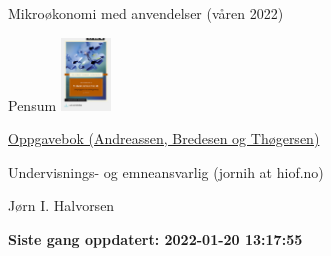 \documentclass[
  ignorenonframetext,
]{beamer}
\begin{document}
\begin{frame}{Mikroøkonomi med anvendelser (våren 2022)}
\begin{block}{Pensum}
\includegraphics[width=0.1\textwidth,height=\textheight]{man/figures/oppgaver.jpg}

\href{https://www.cappelendammundervisning.no/_innforing-i-mikrookonomi-ovingsoppgaver-med-losningsforslag-9788202656485}{Oppgavebok
(Andreassen, Bredesen og Thøgersen)}

Undervisnings- og emneansvarlig (jornih at hiof.no)

Jørn I. Halvorsen

\textbf{Siste gang oppdatert: 2022-01-20 13:17:55}
\end{block}
\end{frame}
\end{document}
